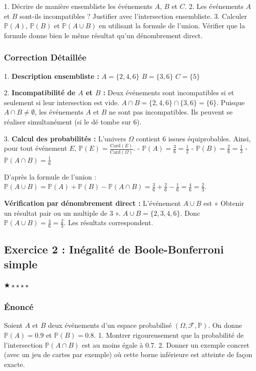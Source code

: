 \documentclass[11pt,a4paper]{article}
\begin{document}
1. Décrire de manière ensembliste les événements $A$, $B$ et $C$.
2. Les événements $A$ et $B$ sont-ils incompatibles ? Justifier avec l'intersection ensembliste.
3. Calculer $\mathbb{P}(A)$, $\mathbb{P}(B)$ et $\mathbb{P}(A \cup B)$ en utilisant la formule de l'union. Vérifier que la formule donne bien le même résultat qu'un dénombrement direct.


\subsubsection*{Correction Détaillée}

1. \textbf{Description ensembliste :}
$A = \{2, 4, 6\}$
$B = \{3, 6\}$
$C = \{5\}$

2. \textbf{Incompatibilité de $A$ et $B$ :}
Deux événements sont incompatibles si et seulement si leur intersection est vide.
$A \cap B = \{2, 4, 6\} \cap \{3, 6\} = \{6\}$.
Puisque $A \cap B \neq \emptyset$, les événements $A$ et $B$ ne sont pas incompatibles. Ils peuvent se réaliser simultanément (si le dé tombe sur $6$).

3. \textbf{Calcul des probabilités :}
L'univers $\Omega$ contient $6$ issues équiprobables. Ainsi, pour tout événement $E$, $\mathbb{P}(E) = \frac{\text{Card}(E)}{\text{Card}(\Omega)}$.
- $\mathbb{P}(A) = \frac{3}{6} = \frac{1}{2}$
- $\mathbb{P}(B) = \frac{2}{6} = \frac{1}{3}$
- $\mathbb{P}(A \cap B) = \frac{1}{6}$

D'après la formule de l'union :
$\mathbb{P}(A \cup B) = \mathbb{P}(A) + \mathbb{P}(B) - \mathbb{P}(A \cap B) = \frac{3}{6} + \frac{2}{6} - \frac{1}{6} = \frac{4}{6} = \frac{2}{3}$.

\textbf{Vérification par dénombrement direct :}
L'événement $A \cup B$ est « Obtenir un résultat pair ou un multiple de $3$ ».
$A \cup B = \{2, 3, 4, 6\}$.
Donc $\mathbb{P}(A \cup B) = \frac{4}{6} = \frac{2}{3}$. Les résultats correspondent.



\subsection*{Exercice 2 : Inégalité de Boole-Bonferroni simple}
$\bigstar\star\star\star\star$

\subsubsection*{Énoncé}

Soient $A$ et $B$ deux événements d'un espace probabilisé $(\Omega, \mathcal{F}, \mathbb{P})$.
On donne $\mathbb{P}(A) = 0.9$ et $\mathbb{P}(B) = 0.8$.
1. Montrer rigoureusement que la probabilité de l'intersection $\mathbb{P}(A \cap B)$ est au moins égale à $0.7$.
2. Donner un exemple concret (avec un jeu de cartes par exemple) où cette borne inférieure est atteinte de façon exacte.
\end{document}

